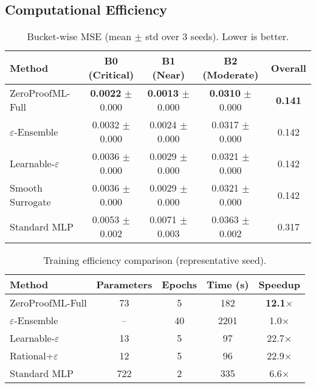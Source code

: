 \documentclass[twoside,11pt]{article}
\begin{document}




\subsection{Computational Efficiency}
\begin{table}[t]
\centering
\caption{Bucket-wise MSE (mean $\pm$ std over 3 seeds). Lower is better.}
\label{tab:bucket_mse}
\begin{tabular}{lcccc}
\toprule
Method & B0 (Critical) & B1 (Near) & B2 (Moderate) & Overall \\
\midrule
ZeroProofML-Full & \textbf{0.0022} $\pm$ 0.000 & \textbf{0.0013} $\pm$ 0.000 & \textbf{0.0310} $\pm$ 0.000 & \textbf{0.141} \\
$\varepsilon$-Ensemble & 0.0032 $\pm$ 0.000 & 0.0024 $\pm$ 0.000 & 0.0317 $\pm$ 0.000 & 0.142 \\
Learnable-$\varepsilon$ & 0.0036 $\pm$ 0.000 & 0.0029 $\pm$ 0.000 & 0.0321 $\pm$ 0.000 & 0.142 \\
Smooth Surrogate & 0.0036 $\pm$ 0.000 & 0.0029 $\pm$ 0.000 & 0.0321 $\pm$ 0.000 & 0.142 \\
Standard MLP & 0.0053 $\pm$ 0.002 & 0.0071 $\pm$ 0.003 & 0.0363 $\pm$ 0.002 & 0.317 \\
\bottomrule
\end{tabular}
\end{table}

\begin{table}[t]
\centering
\caption{Training efficiency comparison (representative seed).}
\label{tab:efficiency}
\begin{tabular}{lcccc}
\toprule
Method & Parameters & Epochs & Time (s) & Speedup \\
\midrule
ZeroProofML-Full & 73 & 5 & 182 & \textbf{12.1$\times$} \\
$\varepsilon$-Ensemble & -- & 40 & 2201 & 1.0$\times$ \\
Learnable-$\varepsilon$ & 13 & 5 & 97 & 22.7$\times$ \\
Rational+$\varepsilon$ & 12 & 5 & 96 & 22.9$\times$ \\
Standard MLP & 722 & 2 & 335 & 6.6$\times$ \\
\bottomrule
\end{tabular}
\end{table}
\end{document}
